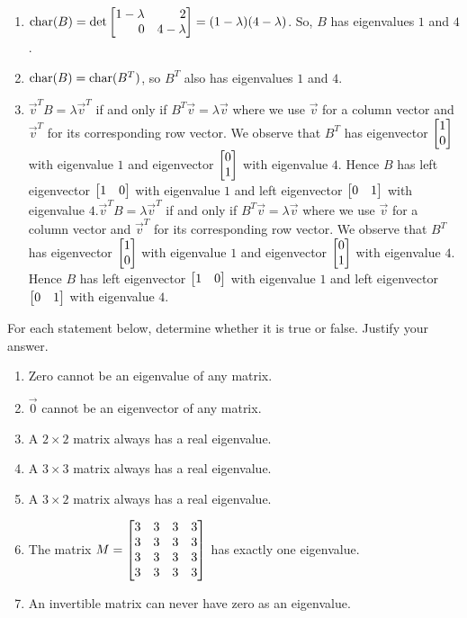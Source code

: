 \begin{exercises}
\begin{problist}
		\begin{solution}
		    \begin{enumerate}
		        \item  $\Char(B) = \det\mat{1 -\lambda & 2 \\ 0 & 4 - \lambda} = (1 - \lambda)(4 - \lambda)$. So, $B$ has eigenvalues $1$ and $4$.
		        \item $\operatorname{char}(B) = \operatorname{char}(B^T)$, so $B^T$ also has eigenvalues $1$ and $4$.
		        \item $\vec{v}^TB = \lambda \vec{v}^T$ if and only if $B^T \vec{v} = \lambda \vec{v}$ where we use $\vec{v}$ for a column vector and $\vec{v}^T$ for its corresponding row vector. We observe that $B^T$ has eigenvector $\mat{1 \\ 0}$ with eigenvalue $1$ and eigenvector $\mat{0\\1}$ with eigenvalue $4$. Hence $B$ has left eigenvector $\mat{1 & 0}$ with eigenvalue $1$ and left eigenvector $\mat{0 & 1}$ with eigenvalue $4$.$\vec{v}^TB = \lambda \vec{v}^T$ if and only if $B^T \vec{v} = \lambda \vec{v}$ where we use $\vec{v}$ for a column vector and $\vec{v}^T$ for its corresponding row vector. We observe that $B^T$ has eigenvector $\mat{1 \\ 0}$ with eigenvalue $1$ and eigenvector $\mat{0\\1}$ with eigenvalue $4$. Hence $B$ has left eigenvector $\mat{1 & 0}$ with eigenvalue $1$ and left eigenvector $\mat{0 & 1}$ with eigenvalue $4$.
		    \end{enumerate}
		\end{solution}

		\prob For each statement below, determine whether it is true or false. Justify your answer.
		\begin{enumerate}
			\item Zero cannot be an eigenvalue of any matrix.
			\item $\vec 0$ cannot be an eigenvector of any matrix.
			\item A $2\times 2$ matrix always has a real eigenvalue.
			\item A $3\times 3$ matrix always has a real eigenvalue.
			\item A $3\times 2$ matrix always has a real eigenvalue.
			\item The matrix $M = \mat{3&3&3&3\\3&3&3&3\\3&3&3&3\\3&3&3&3}$
				has exactly one eigenvalue.
			\item An invertible matrix can never have zero as an eigenvalue.
		\end{enumerate}


\end{problist}
\end{exercises}
